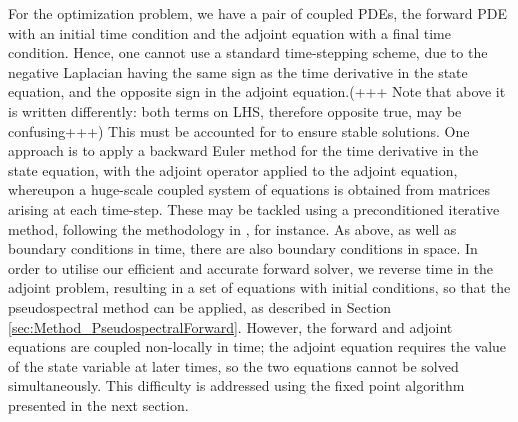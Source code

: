 For the optimization problem, we have a pair of coupled PDEs, the forward PDE with an initial time condition and the adjoint equation with a final time condition. Hence, one cannot use a standard time-stepping scheme, due to the negative Laplacian having the same sign as the time derivative
in the state equation, and the opposite sign in the adjoint equation.(+++ Note that above it is written differently: both terms on LHS, therefore opposite true, may be confusing+++)
This must be accounted for to ensure stable solutions. One approach
is to apply a backward Euler method for the time derivative in the state equation, with the adjoint operator applied to the adjoint equation, whereupon a huge-scale coupled
system of equations is obtained from matrices arising at each time-step. These may be tackled using a preconditioned iterative method, following the
methodology in \cite{PS13,PSW12,SW10}, for instance.  As above,
as well as boundary conditions in time, there are also boundary conditions in space.  In order to utilise our efficient and accurate forward solver, we reverse time in the adjoint problem, resulting in a set of equations with initial conditions, so that the pseudospectral method can be applied, as described in Section \ref{sec:Method_PseudospectralForward}. However, the forward and adjoint equations are coupled non-locally in time; the adjoint equation requires the value of the state variable at later times, so the two equations cannot be solved simultaneously. This difficulty is addressed using the fixed point algorithm presented in the next section.  


